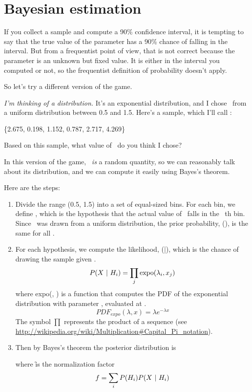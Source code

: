\documentclass[12pt]{book}
\begin{document}


\section{Bayesian estimation}

If you collect a sample and compute a 90\% confidence interval, it is
tempting to say that the true value of the parameter has a 90\% chance
of falling in the interval.  But from a frequentist point of view,
that is not correct because the parameter is an unknown but fixed
value.  It is either in the interval you computed or not, so the
frequentist definition of probability doesn't apply.

So let's try a different version of the game.

{\em I'm thinking of a distribution.}  It's an exponential
distribution, and I chose \mylambda~from a uniform distribution
between 0.5 and 1.5.  Here's a sample, which I'll call \X:

\{2.675, 0.198, 1.152, 0.787, 2.717, 4.269\}

Based on this sample, what value of \mylambda~do you think I chose?

In this version of the game, \mylambda~{\em is} a random quantity, so we
can reasonably talk about its distribution, and we can compute it
easily using Bayes's theorem.

Here are the steps:

\begin{enumerate}

\item Divide the range (0.5, 1.5) into a set of equal-sized bins.
For each bin, we define \HH{}, which is the hypothesis that the
actual value of \mylambda~falls in the \ii~th bin.
Since \mylambda~was drawn from a uniform distribution, the prior
probability, \Prob(\HH{}), is the same for all \ii.

\item For each hypothesis, we compute the likelihood, \Prob(\X|\HH{}),
which is the chance of drawing the sample \X given \HH{}.
%
\[ P(X ~|~ H_i) = \prod_j \mathrm{expo}(\lambda_i, x_j)  \]
%
where expo(\mylambda, \x) is a function that
computes the PDF of the exponential distribution with parameter \mylambda,
evaluated at \x.  
%
\[ PDF_{expo}(\lambda, x) = \lambda e^{-\lambda x}\]
%
The symbol $\prod$ represents the product of a sequence (see
\url{http://wikipedia.org/wiki/Multiplication#Capital_Pi_notation}).

\item Then by Bayes's theorem the posterior distribution is


where \f is the normalization factor
%
\[ f = \sum_i P(H_i) P(X ~|~ H_i) \]
%
\end{enumerate}
\end{document}
